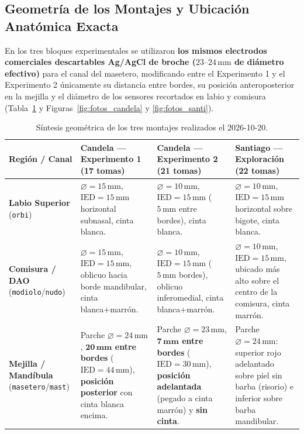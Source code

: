 \documentclass[11pt, a4paper]{article}
\begin{document}
\subsection{Geometría de los Montajes y Ubicación Anatómica Exacta}
En los tres bloques experimentales se utilizaron \textbf{los mismos electrodos comerciales descartables Ag/AgCl de broche ($23\text{--}24\,\text{mm}$ de diámetro efectivo)} para el canal del masetero, modificando entre el Experimento 1 y el Experimento 2 únicamente su distancia entre bordes, su posición anteroposterior en la mejilla y el diámetro de los sensores recortados en labio y comisura (Tabla~\ref{tab:montajes_compacta} y Figuras~\ref{fig:fotos_candela} y \ref{fig:fotos_santi}).

\begin{table}[H]
\centering
\scriptsize
\begin{tabularx}{\textwidth}{l p{4.2cm} p{4.4cm} X}
\toprule
\textbf{Región / Canal} & \textbf{Candela --- Experimento 1} (17 tomas) & \textbf{Candela --- Experimento 2} (21 tomas) & \textbf{Santiago --- Exploración} (22 tomas) \\
\midrule
\textbf{Labio Superior} (\texttt{orbi}) & $\varnothing=15\,\text{mm}$, $\text{IED}=15\,\text{mm}$ horizontal subnasal, cinta blanca. & $\varnothing=10\,\text{mm}$, $\text{IED}=15\,\text{mm}$ ($5\,\text{mm}$ entre bordes), cinta blanca. & $\varnothing=10\,\text{mm}$, $\text{IED}=15\,\text{mm}$ horizontal sobre bigote, cinta blanca. \\
\textbf{Comisura / DAO} (\texttt{modiolo}/\texttt{nudo}) & $\varnothing=15\,\text{mm}$, $\text{IED}=15\,\text{mm}$, oblicuo hacia borde mandibular, cinta blanca+marrón. & $\varnothing=10\,\text{mm}$, $\text{IED}=15\,\text{mm}$ ($5\,\text{mm}$ bordes), oblicuo inferomedial, cinta blanca+marrón. & $\varnothing=10\,\text{mm}$, $\text{IED}=15\,\text{mm}$, ubicado más alto sobre el centro de la comisura, cinta marrón. \\
\textbf{Mejilla / Mandíbula} (\texttt{masetero}/\texttt{mast}) & Parche $\varnothing=24\,\text{mm}$, \textbf{$\mathbf{20\,\text{mm}}$ entre bordes} ($\text{IED}=44\,\text{mm}$), \textbf{posición posterior} con cinta blanca encima. & Parche $\varnothing=23\,\text{mm}$, \textbf{$\mathbf{7\,\text{mm}}$ entre bordes} ($\text{IED}=30\,\text{mm}$), \textbf{posición adelantada} (pegado a cinta marrón) y \textbf{sin cinta}. & Parche $\varnothing=24\,\text{mm}$: superior rojo adelantado sobre piel sin barba (risorio) e inferior sobre barba mandibular. \\
\bottomrule
\end{tabularx}
\caption{Síntesis geométrica de los tres montajes realizados el 2026-10-20.}
\label{tab:montajes_compacta}
\end{table}
\end{document}

